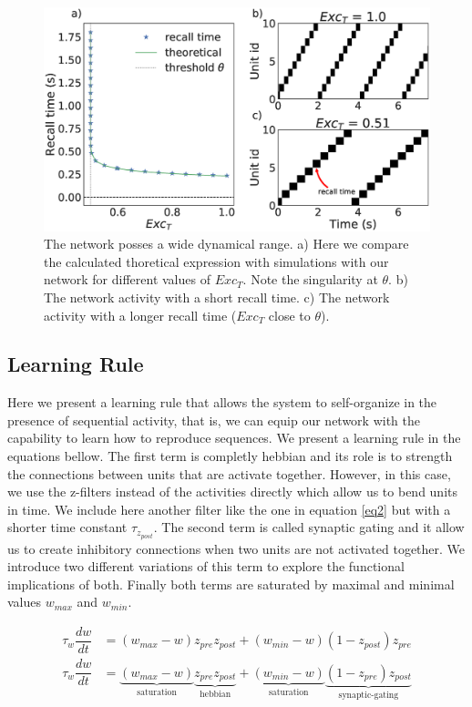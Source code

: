 \documentclass{esannV2}
\begin{document}
\begin{figure}[h!]
\centering
\includegraphics[scale=0.25]{dynamical_range.eps}
\caption{The network posses a wide dynamical range. a) Here we compare the calculated thoretical expression with simulations with our network for different values of $Exc_T$. Note the singularity at $\theta$. b) The network activity with a short recall time. c) The network activity with a longer recall time ($Exc_T$ close to $\theta$).}\label{Fig:dynamical_range}
\end{figure}



\subsection{Learning Rule}
Here we present a learning rule that allows the system to self-organize in the presence of sequential activity, that is, we can equip our network with the capability to learn how to reproduce sequences. We present a learning rule in the equations bellow. The first term is completly hebbian \cite{hebb2005organization} and its role is to strength the connections between units that are activate together. However, in this case, we use the z-filters instead of the activities directly which allow us to bend units in time. We include here another filter like the one in equation \ref{eq2} but with a shorter time constant $\tau_{z_{post}}$. The second term is called synaptic gating \cite{andrew2003spiking} and it allow us to create inhibitory connections when two units are not activated together. We introduce two different variations of this term to explore the functional implications of both. Finally both terms are saturated by maximal and minimal values $w_{max}$ and $w_{min}$. 

\begin{align}
\tag{pre-synaptic}
\tau_w \dfrac{dw}{dt} &= (w_{max} - w) z_{pre}z_{post} + (w_{min} - w) (1 - z_{post})z_{pre} \label{eq:pre-synaptic rule}  \\
\tag{post-synaptic}
\tau_w \dfrac{dw}{dt} &= \underbrace{(w_{max} - w)}_{\text{saturation}} \underbrace{z_{pre}z_{post}}_{\text{hebbian}} + \underbrace{(w_{min} - w)}_{\text{saturation}}\underbrace{ (1 - z_{pre})z_{post}}_{\text{synaptic-gating}} \label{eq:post-synaptic rule}
\end{align}
\end{document}
